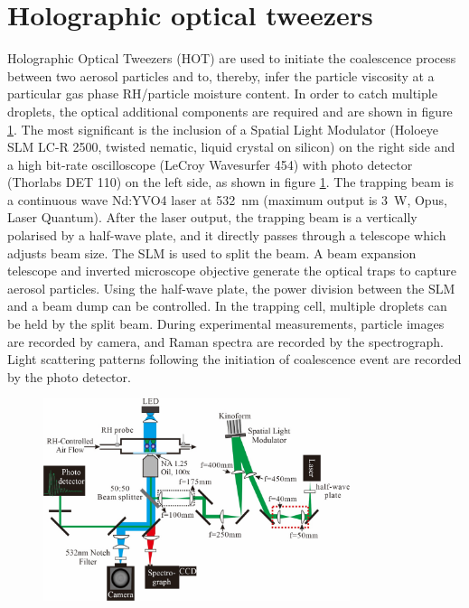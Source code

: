 \section{Holographic optical tweezers}
Holographic Optical Tweezers (HOT) are used to initiate the coalescence process between two aerosol particles and to, thereby, infer the particle viscosity at a particular gas phase RH/particle moisture content\cite{Song2016a}. In order to catch multiple droplets, the optical additional components are required and are shown in figure \ref{fig:wat_s5}. The most significant is the inclusion of a Spatial Light Modulator (Holoeye SLM LC-R 2500, twisted nematic, liquid crystal on silicon) on the right side and a high bit-rate oscilloscope (LeCroy Wavesurfer 454) with photo detector (Thorlabs DET 110) on the left side, as shown in figure \ref{fig:wat_s5}. The trapping beam is a continuous wave Nd:YVO4 laser at \SI{532}{\nano\meter} (maximum output is \SI{3}{\watt}, Opus, Laser Quantum). After the laser output, the trapping beam is a vertically polarised by a half-wave plate, and it directly passes through a telescope which adjusts beam size. The SLM is used to split the beam. A beam expansion telescope and inverted microscope objective generate the optical traps to capture aerosol particles. Using the half-wave plate, the power division between the SLM and a beam dump can be controlled. In the trapping cell, multiple droplets can be held by the split beam. During experimental measurements, particle images are recorded by camera, and Raman spectra are recorded by the spectrograph. Light scattering patterns following the initiation of coalescence event are recorded by the photo detector.

\begin{figure}
    \centering
    \includegraphics[width=0.8\textwidth]{chapters/water_hopping/figures/image011.jpg}
    \label{fig:wat_s5}
\end{figure}

